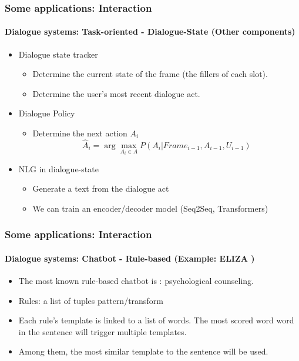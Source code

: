 \documentclass[xcolor=table]{beamer}
\begin{document}
\begin{frame}
	\frametitle{Some applications: Interaction}
	\framesubtitle{Dialogue systems: Task-oriented - Dialogue-State (Other components)}
	
	\begin{itemize}
		\item Dialogue state tracker
		\begin{itemize}
			\item Determine the current state of the frame (the fillers of each slot).
			\item Determine the user's most recent dialogue act.
		\end{itemize}
	
		\item Dialogue Policy
		\begin{itemize}
			\item Determine the next action $A_i$ 
			\[\hat{A}_i = \arg\max_{A_i \in A} P(A_i | Frame_{i-1}, A_{i-1}, U_{i-1})\]
		\end{itemize}
	
		\item NLG in dialogue-state 
		\begin{itemize}
			\item Generate a text from the dialogue act
			\item We can train an encoder/decoder model (Seq2Seq, Transformers)
		\end{itemize}
	\end{itemize}
	
\end{frame}

\begin{frame}
	\frametitle{Some applications: Interaction}
	\framesubtitle{Dialogue systems: Chatbot - Rule-based (Example: ELIZA \cite{1966-Weizenbaum})}
	
	\begin{itemize}
		\item The most known rule-based chatbot is : psychological counseling.
		\item Rules: a list of tuples pattern/transform 
		
		
		
		\item Each rule's template is linked to a list of words. 
		The most scored word word in the sentence will trigger multiple templates.
		
		\item Among them, the most similar template to the sentence will be used.
	\end{itemize}
	
\end{frame}
\end{document}
